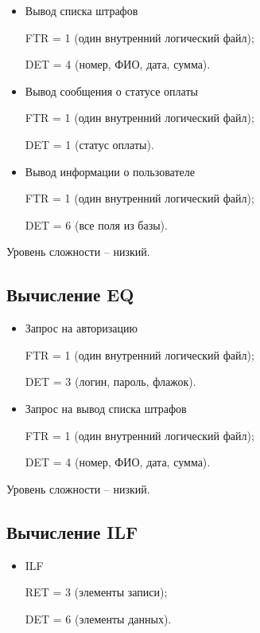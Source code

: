 \begin{itemize}[label = ---]
    \item Вывод списка штрафов
    
    FTR = 1 (один внутренний логический файл);
    
    DET = 4 (номер, ФИО, дата, сумма).
    
    \item Вывод сообщения о статусе оплаты
    
    FTR = 1 (один внутренний логический файл);
    
    DET = 1 (статус оплаты).
    
    \item Вывод информации о пользователе
    
    FTR = 1 (один внутренний логический файл);
    
    DET = 6 (все поля из базы).

\end{itemize}

Уровень сложности – низкий.

\subsection*{Вычисление EQ}

\begin{itemize}[label = ---]
    \item Запрос на авторизацию
    
    FTR = 1 (один внутренний логический файл);
    
    DET = 3 (логин, пароль, флажок).
    
    \item Запрос на вывод списка штрафов
    
    FTR = 1 (один внутренний логический файл);
    
    DET = 4 (номер, ФИО, дата, сумма).
\end{itemize}

Уровень сложности – низкий.

\subsection*{Вычисление ILF}

\begin{itemize}[label = ---]
    \item ILF
    
    RET = 3 (элементы записи);
    
    DET = 6 (элементы данных).
\end{itemize}

